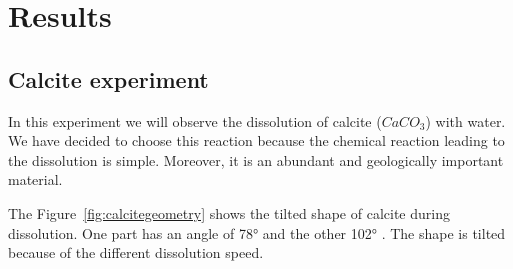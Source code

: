 \chapter{Results}
\label{chap:results}


\section{Calcite experiment}

In this experiment we will observe the dissolution of calcite ($CaCO_3$) with water. We have decided to choose this reaction because the chemical reaction leading to the dissolution is simple. Moreover, it is an abundant and geologically important material.\cite{hillner1992atomic}\cite{liang1996dissolution} \cite{paquette1995relationship}

The Figure~\ref{fig:calcitegeometry} shows the tilted shape of calcite during dissolution. One part has an angle of 78° and the other 102°\cite{shiraki2000dissolution} \cite{Morse200251}. The shape is tilted because of the different dissolution speed.

